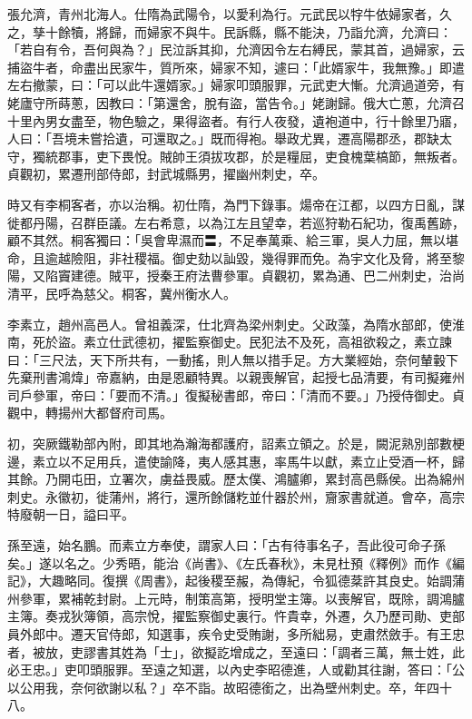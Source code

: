 \begin{pinyinscope}
 張允濟，青州北海人。仕隋為武陽令，以愛利為行。元武民以牸牛依婦家者，久之，孳十餘犢，將歸，而婦家不與牛。民訴縣，縣不能決，乃詣允濟，允濟曰：「若自有令，吾何與為？」民泣訴其抑，允濟因令左右縛民，蒙其首，過婦家，云捕盜牛者，命盡出民家牛，質所來，婦家不知，遽曰：「此婿家牛，我無豫。」即遣左右撤蒙，曰：「可以此牛還婿家。」婦家叩頭服罪，元武吏大慚。允濟過道旁，有姥廬守所蒔蔥，因教曰：「第還舍，脫有盜，當告令。」姥謝歸。俄大亡蔥，允濟召十里內男女盡至，物色驗之，果得盜者。有行人夜發，遺袍道中，行十餘里乃寤，人曰：「吾境未嘗拾遺，可還取之。」既而得袍。舉政尤異，遷高陽郡丞，郡缺太守，獨統郡事，吏下畏悅。賊帥王須拔攻郡，於是糧屈，吏食槐葉槁節，無叛者。貞觀初，累遷刑部侍郎，封武城縣男，擢幽州刺史，卒。



 時又有李桐客者，亦以治稱。初仕隋，為門下錄事。煬帝在江都，以四方日亂，謀徙都丹陽，召群臣議。左右希意，以為江左且望幸，若巡狩勒石紀功，復禹舊跡，顧不其然。桐客獨曰：「吳會卑濕而〓，不足奉萬乘、給三軍，吳人力屈，無以堪命，且逾越險阻，非社稷福。御史劾以訕毀，幾得罪而免。為宇文化及脅，將至黎陽，又陷竇建德。賊平，授秦王府法曹參軍。貞觀初，累為通、巴二州刺史，治尚清平，民呼為慈父。桐客，冀州衡水人。



 李素立，趙州高邑人。曾祖義深，仕北齊為梁州刺史。父政藻，為隋水部郎，使淮南，死於盜。素立仕武德初，擢監察御史。民犯法不及死，高祖欲殺之，素立諫曰：「三尺法，天下所共有，一動搖，則人無以措手足。方大業經始，奈何輦轂下先棄刑書鴻煒」帝嘉納，由是恩顧特異。以親喪解官，起授七品清要，有司擬雍州司戶參軍，帝曰：「要而不清。」復擬秘書郎，帝曰：「清而不要。」乃授侍御史。貞觀中，轉揚州大都督府司馬。



 初，突厥鐵勒部內附，即其地為瀚海都護府，詔素立領之。於是，闕泥熟別部數梗邊，素立以不足用兵，遣使諭降，夷人感其惠，率馬牛以獻，素立止受酒一杯，歸其餘。乃開屯田，立署次，虜益畏威。歷太僕、鴻臚卿，累封高邑縣侯。出為綿州刺史。永徽初，徙蒲州，將行，還所餘儲籺並什器於州，齎家書就道。會卒，高宗特廢朝一日，謚曰平。



 孫至遠，始名鵬。而素立方奉使，謂家人曰：「古有待事名子，吾此役可命子孫矣。」遂以名之。少秀晤，能治《尚書》、《左氏春秋》，未見杜預《釋例》而作《編記》，大趣略同。復撰《周書》，起後稷至赧，為傳紀，令狐德棻許其良史。始調蒲州參軍，累補乾封尉。上元時，制策高第，授明堂主簿。以喪解官，既除，調鴻臚主簿。奏戎狄簿領，高宗悅，擢監察御史裏行。忤貴幸，外遷，久乃歷司勛、吏部員外郎中。遷天官侍郎，知選事，疾令史受賄謝，多所絀易，吏肅然斂手。有王忠者，被放，吏謬書其姓為「士」，欲擬訖增成之，至遠曰：「調者三萬，無士姓，此必王忠。」吏叩頭服罪。至遠之知選，以內史李昭德進，人或勸其往謝，答曰：「公以公用我，奈何欲謝以私？」卒不詣。故昭德銜之，出為壁州刺史。卒，年四十八。




\end{pinyinscope}
